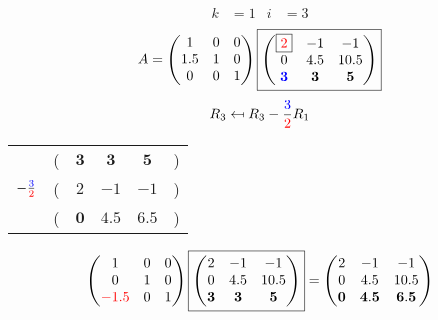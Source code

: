 \documentclass[pdf]{beamer}
\begin{document}
\begin{frame}{}\begin{align*} k &= 1 & i &= 3 \end{align*} $$A=\begin{pmatrix}1&0&0\\1.5&1&0\\0&0&1\end{pmatrix} \boxed{\begin{pmatrix}\boxed{{\color{red}2}}&-1&-1\\0&4.5&10.5\\\mathbf{{\color{blue}3}}&\mathbf{3}&\mathbf{5}\end{pmatrix}} $$ $$R_3 \mapsfrom R_3 - \frac{{\color{blue}3}}{{\color{red}2}} R_1$$ \begin{center}\begin{tabular}{cccccc}  &(& $ \mathbf{3} $ & $ \mathbf{3} $ & $ \mathbf{5} $ &)\\$ -\frac{{\color{blue}3}}{{\color{red}2}} $&(& $ 2 $ & $ -1 $ & $ -1 $ &)\\\hline  &(& $ \mathbf{0} $ & $ \mathbf{4.5} $ & $ \mathbf{6.5} $ &) \end{tabular}\end{center} $$ \begin{pmatrix}1&0&0\\0&1&0\\{\color{red}-1.5}&0&1\end{pmatrix} \boxed{\begin{pmatrix}2&-1&-1\\0&4.5&10.5\\\mathbf{3}&\mathbf{3}&\mathbf{5}\end{pmatrix}} = \begin{pmatrix}2&-1&-1\\0&4.5&10.5\\\mathbf{0}&\mathbf{4.5}&\mathbf{6.5}\end{pmatrix} $$\end{frame}
\end{document}
